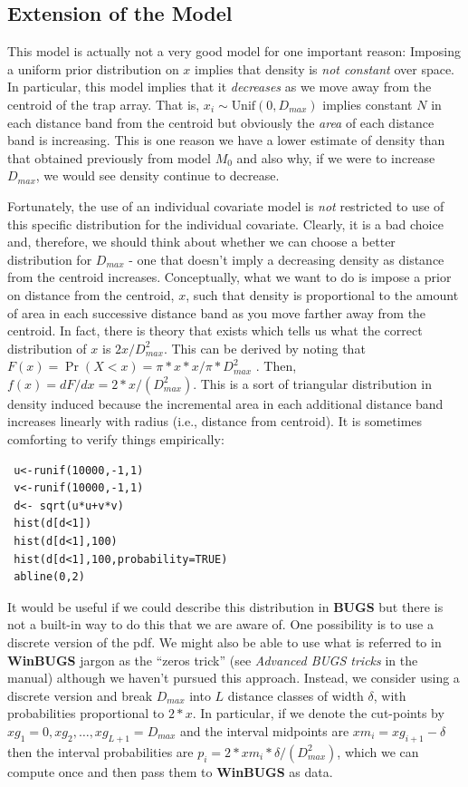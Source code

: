 \subsection{Extension of the Model}

This model is actually not a very good model for one important reason:
Imposing a uniform prior distribution on $x$
implies that density is {\it not constant} over space. In
particular, this model implies that it {\it decreases} as we move away
from the centroid of the trap array. 
That is, $x_{i} \sim \mbox{Unif}(0,D_{max})$ implies constant $N$ in
each distance band from the centroid but obviously the {\it area} of
each distance band is increasing.  
This is one reason we have a
lower estimate of density than that obtained previously from model $M_0$ and also why,
if we were to increase $D_{max}$, we would see density continue to
decrease.

Fortunately, the use of an individual covariate model is {\it not} restricted to
use of this specific distribution for the individual
covariate. Clearly, it is a bad choice and, therefore, we should think
about whether we can choose a better distribution for $D_{max}$ - one that
doesn't imply a decreasing density as distance from the centroid
increases.  Conceptually, what we want to do is impose a prior on
distance from the centroid, $x$, such that density is proportional to
the amount of area in each successive distance band as you move
farther away from the centroid.  In fact, there is theory that exists
which tells us what the correct distribution of $x$ is
$2x/D_{max}^2$. This can be derived by noting that $F(x) = \Pr(X<x) =
\pi*x*x/\pi*D_{max}^{2}$ . Then, $f(x) = dF/dx =
2*x/(D_{max}^{2})$. This is a sort of triangular distribution in
density
induced because the incremental area in each additional distance band
increases linearly with radius (i.e., distance from centroid). It is
sometimes comforting to verify things empirically:
{\small
\begin{verbatim}
 u<-runif(10000,-1,1)
 v<-runif(10000,-1,1)
 d<- sqrt(u*u+v*v)
 hist(d[d<1])
 hist(d[d<1],100)
 hist(d[d<1],100,probability=TRUE)
 abline(0,2)
\end{verbatim}
}

It would be useful if we could describe this distribution in {\bf BUGS} but
there is not a built-in way to do this that we are aware of.  One possibility is to use a
discrete version of the pdf. We might also be able to use what is
referred to in {\bf WinBUGS} jargon as the ``zeros trick'' (see {\it Advanced
BUGS tricks} in the manual) although we haven't pursued this approach. Instead, we
consider using a discrete version and break $D_{max}$ into $L$ distance
classes of width $\delta$, with probabilities proportional to
$2*x$. In particular, if we denote the cut-points by $xg_{1}=0,xg_{2}, \ldots,
xg_{L+1}=D_{max}$ and the interval midpoints are $xm_{i} = 
xg_{i+1}-\delta$ then the interval probabilities are $p_{i} = 
2*xm_{i}*\delta/(D_{max}^{2})$, which we can compute once and then pass
them to {\bf WinBUGS} as data.

